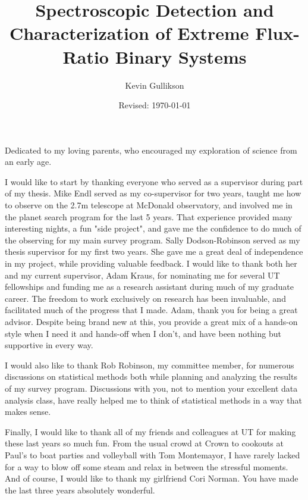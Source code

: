 \documentclass{utthesis}
\begin{document}
\author{Kevin Gullikson}
\title{Spectroscopic Detection and Characterization of Extreme Flux-Ratio Binary Systems}
\date{Revised: \today}

\UTcopyrightlegend %

\begin{UTcommittee}
\end{UTcommittee}


\frontmatter


\begin{UTdedication}
Dedicated to my loving parents, who encouraged my exploration of science from an early age.
\end{UTdedication}

\cleardoublepage
\setcounter{page}{5}

\begin{UTacknowledgements}
I would like to start by thanking everyone who served as a supervisor during part of my thesis. Mike Endl served as my co-supervisor for two years, taught me how to observe on the 2.7m telescope at McDonald observatory, and involved me in the planet search program for the last 5 years. That experience provided many interesting nights, a fun "side project", and gave me the confidence to do much of the observing for my main survey program. Sally Dodson-Robinson served as my thesis supervisor for my first two years. She gave me a great deal of independence in my project, while providing valuable feedback. I would like to thank both her and my current supervisor, Adam Kraus, for nominating me for several UT fellowships and funding me as a research assistant during much of my graduate career. The freedom to work exclusively on research has been invaluable, and facilitated much of the progress that I made. Adam, thank you for being a great advisor. Despite being brand new at this, you provide a great mix of a hands-on style when I need it and hands-off when I don't, and have been nothing but supportive in every way. 

I would also like to thank Rob Robinson, my committee member, for numerous discussions on statistical methods both while planning and analyzing the results of my survey program. Discussions with you, not to mention your excellent data analysis class, have really helped me to think of statistical methods in a way that makes sense.

Finally, I would like to thank all of my friends and colleagues at UT for making these last years so much fun. From the usual crowd at Crown to cookouts at Paul's to boat parties and volleyball with Tom Montemayor, I have rarely lacked for a way to blow off some steam and relax in between the stressful moments. And of course, I would like to thank my girlfriend Cori Norman. You have made the last three years absolutely wonderful.

\end{UTacknowledgements}
\end{document}
